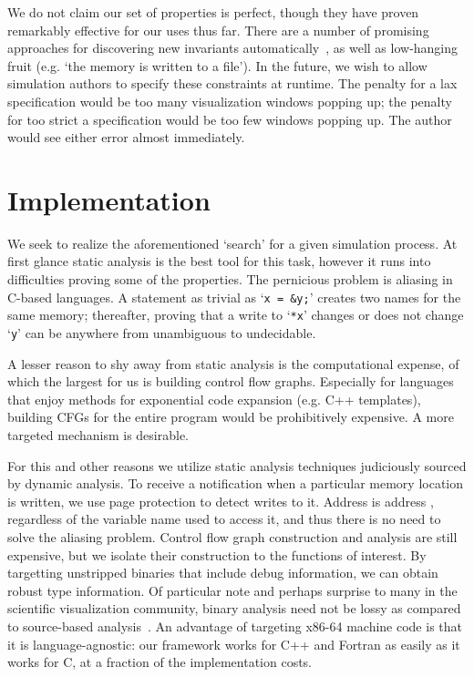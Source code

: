 We do not claim our set of properties is perfect, though they have
proven remarkably effective for our uses thus far.  There are a number
of promising approaches for discovering new invariants
automatically~\cite{Nguyen:2012:Invariants, McCloskey:2010:Infer,
Sharma:2013:DDEC}, as well as low-hanging fruit (e.g. `the memory
is written to a file').  In the future, we wish to allow simulation
authors to specify these constraints at runtime.  The penalty for a lax
specification would be too many visualization windows popping up; the
penalty for too strict a specification would be too few windows popping
up.  The author would see either error almost immediately.

\section{Implementation}

We seek to realize the aforementioned `search' for a given simulation
process.  At first glance static analysis is the best tool for this
task, however it runs into difficulties proving some of the properties.
The pernicious problem is aliasing in C-based languages.  A statement
as
trivial as `\texttt{x = \&y;}' creates two names for the same memory;
thereafter, proving that a write to `\texttt{*x}' changes or does not
change
`\texttt{y}' can be anywhere from unambiguous to undecidable.

A lesser reason to shy away from static analysis is the computational
expense, of which the largest for us is building control flow graphs.
Especially for languages that enjoy methods for exponential code
expansion (e.g. C++ templates), building CFGs for the entire program
would be prohibitively expensive.  A more targeted mechanism is
desirable.

For this and other reasons we utilize static analysis techniques
judiciously sourced by dynamic analysis.  To receive a notification
when a particular memory location is written, we use page protection to
detect writes to it.
Address  is address
, regardless of the variable name used to access it,
and thus there is no need to solve the aliasing problem.  Control
flow graph construction and analysis are still expensive, but we
isolate their construction to the functions of interest.  By targetting
unstripped binaries that include debug information, we can obtain
robust type information.  Of particular note and perhaps surprise to
many in the scientific visualization community, binary analysis need
not be lossy as compared to source-based
analysis~\cite{Reps:2010:Bottom}.  An advantage of targeting x86-64
machine code is that it is language-agnostic: our framework works for
C++ and Fortran as easily as it works for C, at a fraction of the
implementation costs.

